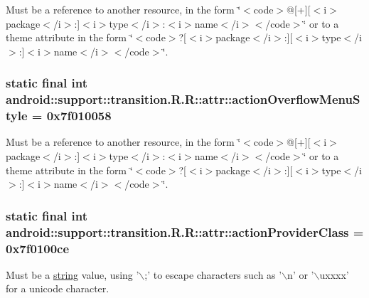 Must be a reference to another resource, in the form \char`\"{}$<$code$>$@\mbox{[}+\mbox{]}\mbox{[}$<$i$>$package$<$/i$>$:\mbox{]}$<$i$>$type$<$/i$>$:$<$i$>$name$<$/i$>$$<$/code$>$\char`\"{} or to a theme attribute in the form \char`\"{}$<$code$>$?\mbox{[}$<$i$>$package$<$/i$>$:\mbox{]}\mbox{[}$<$i$>$type$<$/i$>$:\mbox{]}$<$i$>$name$<$/i$>$$<$/code$>$\char`\"{}. \hypertarget{classandroid_1_1support_1_1transition_1_1_r_1_1attr_2946eba70c02cd6bb6b53c224ffe37c8}{
\subsubsection[{actionOverflowMenuStyle}]{\setlength{\rightskip}{0pt plus 5cm}static final int android::support::transition.R.R::attr::actionOverflowMenuStyle = 0x7f010058}}
\label{classandroid_1_1support_1_1transition_1_1_r_1_1attr_2946eba70c02cd6bb6b53c224ffe37c8}


Must be a reference to another resource, in the form \char`\"{}$<$code$>$@\mbox{[}+\mbox{]}\mbox{[}$<$i$>$package$<$/i$>$:\mbox{]}$<$i$>$type$<$/i$>$:$<$i$>$name$<$/i$>$$<$/code$>$\char`\"{} or to a theme attribute in the form \char`\"{}$<$code$>$?\mbox{[}$<$i$>$package$<$/i$>$:\mbox{]}\mbox{[}$<$i$>$type$<$/i$>$:\mbox{]}$<$i$>$name$<$/i$>$$<$/code$>$\char`\"{}. \hypertarget{classandroid_1_1support_1_1transition_1_1_r_1_1attr_18ff34e10c70f175292c3eb154d860df}{
\subsubsection[{actionProviderClass}]{\setlength{\rightskip}{0pt plus 5cm}static final int android::support::transition.R.R::attr::actionProviderClass = 0x7f0100ce}}
\label{classandroid_1_1support_1_1transition_1_1_r_1_1attr_18ff34e10c70f175292c3eb154d860df}


Must be a \hyperlink{classandroid_1_1support_1_1transition_1_1_r_1_1string}{string} value, using '$\backslash$;' to escape characters such as '$\backslash$n' or '$\backslash$uxxxx' for a unicode character. 

